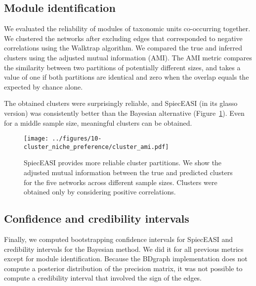 \documentclass[
  a4paper,
]{article}
\begin{document}
\hypertarget{module-identification}{%
\subsection{Module identification}\label{module-identification}}

We evaluated the reliability of modules of taxonomic units co-occurring
together. We clustered the networks after excluding edges that
corresponded to negative correlations using the Walktrap algorithm. We
compared the true and inferred clusters using the adjusted mutual
information (AMI). The AMI metric compares the similarity between two
partitions of potentially different sizes, and takes a value of one if
both partitions are identical and zero when the overlap equals the
expected by chance alone.

The obtained clusters were surprisingly reliable, and SpiecEASI (in its
glasso version) was consistently better than the Bayesian alternative
(Figure~\ref{fig-ami}). Even for a middle sample size, meaningful
clusters can be obtained.

\begin{figure}

{\centering \texttt{[image: ../figures/10-cluster\_niche\_preference/cluster\_ami.pdf]}

}

\caption{\label{fig-ami}SpiecEASI provides more reliable cluster
partitions. We show the adjusted mutual information between the true and
predicted clusters for the five networks across different sample sizes.
Clusters were obtained only by considering positive correlations.}

\end{figure}

\hypertarget{confidence-and-credibility-intervals}{%
\subsection{Confidence and credibility
intervals}\label{confidence-and-credibility-intervals}}

Finally, we computed bootstrapping confidence intervals for SpiecEASI
and credibility intervals for the Bayesian method. We did it for all
previous metrics except for module identification. Because the BDgraph
implementation does not compute a posterior distribution of the
precision matrix, it was not possible to compute a credibility interval
that involved the sign of the edges.
\end{document}
